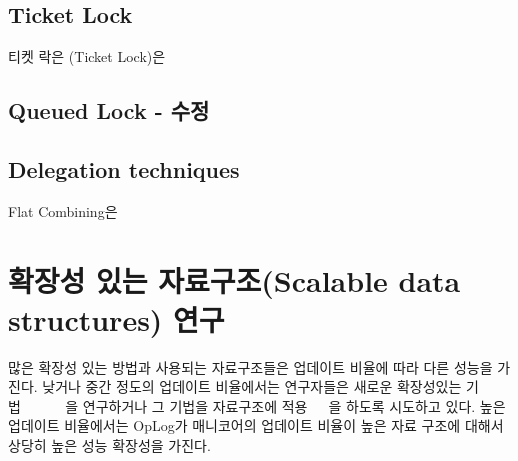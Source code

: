 \subsection{Ticket Lock}



티켓 락은 (Ticket Lock)은 

\subsection{Queued Lock - 수정}



\subsection{Delegation techniques}

Flat Combining은 




\newpage
\section{확장성 있는 자료구조(Scalable data structures) 연구}
\label{sec:datarelated}
많은 확장성 있는 방법과 사용되는 자료구조들은 업데이트 비율에 따라 다른 성능을 가진다.  
낮거나 중간 정도의 업데이트 비율에서는 연구자들은 새로운 확장성있는
기법~\cite{McKenney98}~\cite{Matveev2015RLU}~\cite{Harris2001Lockfree} ~\cite{Fomitchev2004Lockfree}
~\cite{Timnat2012}을 연구하거나 그 기법을 자료구조에 
적용~\cite{Arbel2014ConcurrentRCU}~\cite{Dodds2015SCT}~\cite{AustinTClements2012RCUBalancedTrees}을
하도록 시도하고 있다.
높은 업데이트 비율에서는 OpLog가 매니코어의 업데이트 비율이 높은 자료 구조에 대해서
 상당히 높은 성능 확장성을 가진다. 


